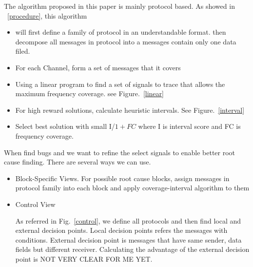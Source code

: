 \documentclass[conference]{IEEEtran}
\begin{document}
The algorithm proposed in this paper is mainly protocol based.  As showed in ~\ref{procedure}, this algorithm 
\begin{itemize}
\item will first define a family of protocol in an understandable format. then decompose all messages in protocol into a messages contain only one data filed. 
\item For each Channel, form a set of messages that it covers
\item Using a linear program to find a set of signals to trace that allows the maximum frequency coverage. see Figure.~\ref{linear}
\item For high reward solutions, calculate heuristic intervals. See Figure.~\ref{interval}
\item Select best solution with small I/\(1+FC\) where I is interval score and FC is frequency coverage.
\end{itemize}

When find bugs and we want to refine the select signals to enable better root cause finding. There are several ways we can use.
\begin{itemize}
\item Block-Specific Views. For possible root cause blocks, assign messages in protocol family into each block and apply coverage-interval algorithm to them
\item Control View

As referred in Fig.~\ref{control}, we define all protocols and then find local and external decision points. Local decision points refers the messages with conditions. External decision point is messages that have same sender, data fields but different receiver. Calculating the advantage of the external decision point is NOT VERY CLEAR FOR ME YET. 
\end{itemize}
\end{document}
